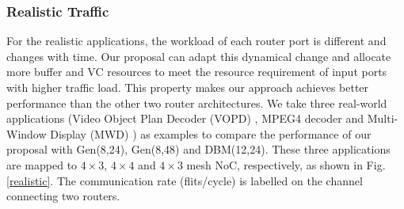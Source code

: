 \documentclass[10pt,conference]{IEEEtran}
\begin{document}
\subsubsection{Realistic Traffic}
For the realistic applications, the workload of each router port is different and changes with time. Our proposal can adapt this dynamical change and allocate more buffer and VC resources to meet the resource requirement of input ports with higher traffic load. This property makes our approach achieves better performance than the other two router architectures. We take three real-world applications (Video Object Plan Decoder (VOPD) \cite{6553191}, MPEG4 decoder \cite{Tol2001} and Multi-Window Display (MWD) \cite{1374853}) as examples to compare the performance of our proposal with Gen(8,24), Gen(8,48) and DBM(12,24). These three applications are mapped to $4\times 3$, $4\times 4$ and $4\times 3$ mesh NoC, respectively, as shown in Fig. \ref{realistic}. The communication rate (flits/cycle) is labelled on the channel connecting two routers.

\end{document}
